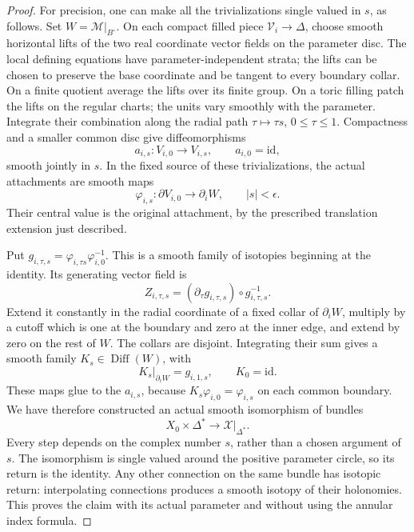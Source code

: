 \begin{proof}
For precision, one can make all the trivializations single valued in \(s\), as follows. Set \(W=\mathscr M|_{B^\circ}\). On each compact filled piece \(\mathcal V_i\to\Delta\), choose smooth horizontal lifts of the two real coordinate vector fields on the parameter disc. The local defining equations have parameter-independent strata; the lifts can be chosen to preserve the base coordinate and be tangent to every boundary collar. On a finite quotient average the lifts over its finite group. On a toric filling patch the lifts on the regular charts; the units vary smoothly with the parameter. Integrate their combination along the radial path \(\tau\mapsto\tau s\), \(0\leq\tau\leq1\). Compactness and a smaller common disc give diffeomorphisms \[
 a_{i,s}:V_{i,0}\longrightarrow V_{i,s},\qquad a_{i,0}=\mathrm{id},
\] smooth jointly in \(s\). In the fixed source of these trivializations, the actual attachments are smooth maps \[
 \varphi_{i,s}:\partial V_{i,0}\longrightarrow\partial_iW,
 \qquad |s|<\epsilon.
\] Their central value is the original attachment, by the prescribed translation extension just described.

Put \(g_{i,\tau,s}=\varphi_{i,\tau s}\varphi_{i,0}^{-1}\). This is a smooth family of isotopies beginning at the identity. Its generating vector field is \[
 Z_{i,\tau,s}=(\partial_\tau g_{i,\tau,s})\circ g_{i,\tau,s}^{-1}.
\] Extend it constantly in the radial coordinate of a fixed collar of \(\partial_iW\), multiply by a cutoff which is one at the boundary and zero at the inner edge, and extend by zero on the rest of \(W\). The collars are disjoint. Integrating their sum gives a smooth family \(K_s\in\operatorname{Diff}(W)\), with \[
 K_s|_{\partial_iW}=g_{i,1,s},\qquad K_0=\mathrm{id}.
\] These maps glue to the \(a_{i,s}\), because \(K_s\varphi_{i,0}=\varphi_{i,s}\) on each common boundary. We have therefore constructed an actual smooth isomorphism of bundles \[
 X_0\times\Delta^*\longrightarrow\mathcal X|_{\Delta^*}.
\] Every step depends on the complex number \(s\), rather than a chosen argument of \(s\). The isomorphism is single valued around the positive parameter circle, so its return is the identity. Any other connection on the same bundle has isotopic return: interpolating connections produces a smooth isotopy of their holonomies. This proves the claim with its actual parameter and without using the annular index formula.
\end{proof}
